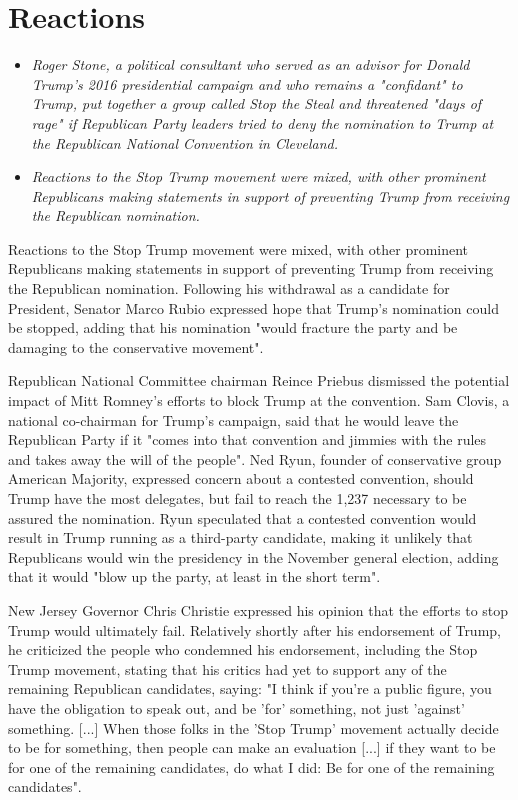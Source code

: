 \section{Reactions}\label{reactions}

\begin{itemize}
\item
  \emph{Roger Stone, a political consultant who served as an advisor for
  Donald Trump's 2016 presidential campaign and who remains a
  "confidant" to Trump, put together a group called Stop the Steal and
  threatened "days of rage" if Republican Party leaders tried to deny
  the nomination to Trump at the Republican National Convention in
  Cleveland.}
\item
  \emph{Reactions to the Stop Trump movement were mixed, with other
  prominent Republicans making statements in support of preventing Trump
  from receiving the Republican nomination.}
\end{itemize}

Reactions to the Stop Trump movement were mixed, with other prominent
Republicans making statements in support of preventing Trump from
receiving the Republican nomination. Following his withdrawal as a
candidate for President, Senator Marco Rubio expressed hope that Trump's
nomination could be stopped, adding that his nomination "would fracture
the party and be damaging to the conservative movement".

Republican National Committee chairman Reince Priebus dismissed the
potential impact of Mitt Romney's efforts to block Trump at the
convention. Sam Clovis, a national co-chairman for Trump's campaign,
said that he would leave the Republican Party if it "comes into that
convention and jimmies with the rules and takes away the will of the
people". Ned Ryun, founder of conservative group American Majority,
expressed concern about a contested convention, should Trump have the
most delegates, but fail to reach the 1,237 necessary to be assured the
nomination. Ryun speculated that a contested convention would result in
Trump running as a third-party candidate, making it unlikely that
Republicans would win the presidency in the November general election,
adding that it would "blow up the party, at least in the short term".

New Jersey Governor Chris Christie expressed his opinion that the
efforts to stop Trump would ultimately fail. Relatively shortly after
his endorsement of Trump, he criticized the people who condemned his
endorsement, including the Stop Trump movement, stating that his critics
had yet to support any of the remaining Republican candidates, saying:
"I think if you're a public figure, you have the obligation to speak
out, and be 'for' something, not just 'against' something. {[}...{]}
When those folks in the 'Stop Trump' movement actually decide to be for
something, then people can make an evaluation {[}...{]} if they want to
be for one of the remaining candidates, do what I did: Be for one of the
remaining candidates".

